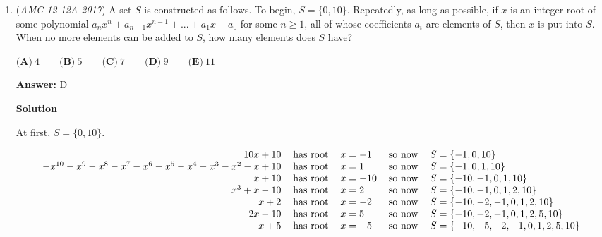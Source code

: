 \begin{enumerate}
 \textbf{Answer: }E



\textbf{Solution}

By the properties of logarithms, we can rearrange the equation to read $x^{2017}=2017x$ with $x=\log_b a$. If $x\neq 0$, we may divide by it and get $x^{2016}=2017$, which implies $x=\pm \root{2016}\of{2017}$. Hence, we have $3$ possible values $x$, namely 
 \[x=0,\qquad x=2017^{\frac1{2016}},\, \text{and}\quad  x=-2017^{\frac1{2016}}.\]

 Since $\log_b a=x$ is equivalent to $a=b^x$, each possible value $x$ yields exactly $199$ solutions $(b,a)$, as we can assign $a=b^x$ to each $b=2,3,\dots,200$. In total, we have $3\cdot 199=\boxed{\textbf{(E) } 597}$ solutions.

 


 


	\item (\textit{AMC 12 12A 2017}) A set $S$ is constructed as follows. To begin, $S = \{0,10\}$. Repeatedly, as long as possible, if $x$ is an integer root of some polynomial $a_{n}x^n + a_{n-1}x^{n-1} + ... + a_{1}x + a_0$ for some $n\geq{1}$, all of whose coefficients $a_i$ are elements of $S$, then $x$ is put into $S$. When no more elements can be added to $S$, how many elements does $S$ have?


 $\textbf{(A)}\ 4 \qquad \textbf{(B)}\ 5 \qquad\textbf{(C)}\ 7 \qquad\textbf{(D)}\ 9 \qquad\textbf{(E)}\ 11$

 \textbf{Answer: }D



\textbf{Solution}

At first, $S=\{0,10\}$.

 
 \[\begin{tabular}{r c l c l} \(10x+10\) & has root & \(x=-1\) & so now & \(S=\{-1,0,10\}\) \\ \(-x^{10}-x^9-x^8-x^7-x^6-x^5-x^4-x^3-x^2-x+10\) & has root & \(x=1\) & so now & \(S=\{-1,0,1,10\}\) \\ \(x+10\) & has root & \(x=-10\) & so now & \(S=\{-10,-1,0,1,10\}\) \\ \(x^3+x-10\) & has root & \(x=2\) & so now & \(S=\{-10,-1,0,1,2,10\}\) \\ \(x+2\) & has root & \(x=-2\) & so now & \(S=\{-10,-2,-1,0,1,2,10\}\) \\ \(2x-10\) & has root & \(x=5\) & so now & \(S=\{-10,-2,-1,0,1,2,5,10\}\) \\ \(x+5\) & has root & \(x=-5\) & so now & \(S=\{-10,-5,-2,-1,0,1,2,5,10\}\) \end{tabular}\]


\end{enumerate}
